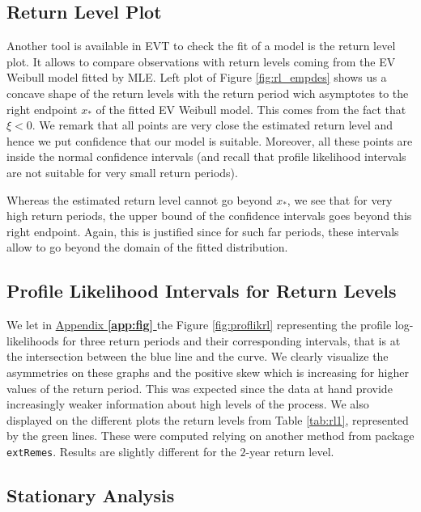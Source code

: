 \subsection*{Return Level Plot}

Another tool is available in EVT to check the fit of a model is the return level plot. It allows to compare
observations with return levels coming from the EV Weibull model fitted by MLE. Left plot of
Figure \ref{fig:rl_empdes} shows us a concave shape of the return levels with the return period wich asymptotes to the right endpoint $x_*$ of the fitted EV Weibull model. This comes from the fact that $\xi<0$. We remark
that all points are very close the estimated return level and hence we put confidence that our model
is suitable. Moreover, all these points are inside the normal confidence intervals (and recall that profile
likelihood intervals are not suitable for very small return periods).

Whereas the estimated return level cannot go beyond $x_*$, we see that for very high return periods, the upper bound of the confidence intervals goes beyond this right endpoint. Again, this is justified since for such far periods, these intervals allow to go beyond the domain of the fitted distribution.



\subsection*{Profile Likelihood Intervals for Return Levels}

We let in \hyperref[app:fig]{Appendix \textbf{\ref{app:fig} }} the Figure \ref{fig:proflikrl} representing the profile log-likelihoods for three return periods and their corresponding intervals, that is at the intersection between the blue line and the curve. We
clearly visualize the asymmetries on these graphs and the positive skew which is increasing for higher
values of the return period. This was expected since the data at hand provide increasingly weaker
information about high levels of the process. We also displayed on the different plots the return levels
from Table \ref{tab:rl1}, represented by the green lines. These were computed relying on another method from
package \texttt{extRemes}. Results are slightly different for the $2$-year return level.


\subsection{Stationary Analysis}

